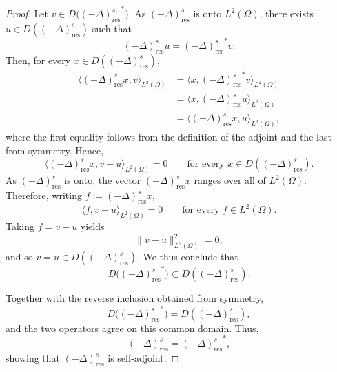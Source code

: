 \documentclass[10pt,a4paper]{amsart}
\begin{document}
\begin{proof}
Let $v\in D\bigl({(-\Delta)^s_{\mathrm{res}}}^*\bigr)$. As $(-\Delta)^s_{\mathrm{res}}$ is onto $L^2(\Omega)$, there exists
$u\in D((-\Delta)^s_{\mathrm{res}})$ such that
\[
    (-\Delta)^s_{\mathrm{res}}u
    =
    {(-\Delta)^s_{\mathrm{res}}}^*v.
\]
Then, for every $x\in D((-\Delta)^s_{\mathrm{res}})$,
\begin{align*}
    \langle (-\Delta)^s_{\mathrm{res}}x,v\rangle_{L^2(\Omega)}
    &=
    \langle x,{(-\Delta)^s_{\mathrm{res}}}^*v\rangle_{L^2(\Omega)} \\
    &=
    \langle x,(-\Delta)^s_{\mathrm{res}}u\rangle_{L^2(\Omega)} \\
    &=
    \langle (-\Delta)^s_{\mathrm{res}}x,u\rangle_{L^2(\Omega)},
\end{align*}
where the first equality follows from the definition of the adjoint
and the last from symmetry. Hence,
\[
    \langle (-\Delta)^s_{\mathrm{res}}x,v-u\rangle_{L^2(\Omega)}
    =
    0
    \qquad
    \text{for every }x\in D((-\Delta)^s_{\mathrm{res}}).
\]
As $(-\Delta)^s_{\mathrm{res}}$ is onto, the vector
$(-\Delta)^s_{\mathrm{res}}x$ ranges over all of $L^2(\Omega)$.
Therefore, writing $f:=(-\Delta)^s_{\mathrm{res}}x$,
\[
    \langle f,v-u\rangle_{L^2(\Omega)}
    =
    0
    \qquad
    \text{for every }f\in L^2(\Omega).
\]
Taking $f=v-u$ yields
\[
    \|v-u\|_{L^2(\Omega)}^2=0,
\]
and so $v=u\in D((-\Delta)^s_{\mathrm{res}})$. We thus conclude that
\[
    D\bigl({(-\Delta)^s_{\mathrm{res}}}^*\bigr)
    \subset
    D((-\Delta)^s_{\mathrm{res}}).
\]

Together with the reverse inclusion obtained from symmetry,
\[
    D\bigl({(-\Delta)^s_{\mathrm{res}}}^*\bigr)
    =
    D((-\Delta)^s_{\mathrm{res}}),
\]
and the two operators agree on this common domain. Thus,
\[
    (-\Delta)^s_{\mathrm{res}}
    =
    {(-\Delta)^s_{\mathrm{res}}}^*,
\]
showing that $(-\Delta)^s_{\mathrm{res}}$ is self-adjoint.
\end{proof}
\end{document}
